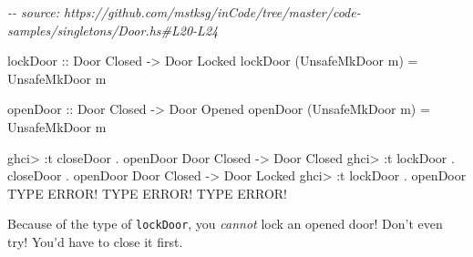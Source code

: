 \documentclass[]{article}
\newenvironment{Shaded}{}{}
\newcommand{\CommentTok}[1]{\textcolor[rgb]{0.38,0.63,0.69}{\textit{#1}}}
\newcommand{\DataTypeTok}[1]{\textcolor[rgb]{0.56,0.13,0.00}{#1}}
\newcommand{\NormalTok}[1]{#1}
\newcommand{\OperatorTok}[1]{\textcolor[rgb]{0.40,0.40,0.40}{#1}}
\newcommand{\OtherTok}[1]{\textcolor[rgb]{0.00,0.44,0.13}{#1}}
\begin{document}
\begin{Shaded}
\begin{Highlighting}[]
\CommentTok{{-}{-} source: https://github.com/mstksg/inCode/tree/master/code{-}samples/singletons/Door.hs\#L20{-}L24}

\OtherTok{lockDoor ::} \DataTypeTok{Door} \DataTypeTok{\textquotesingle{}Closed} \OtherTok{{-}>} \DataTypeTok{Door} \DataTypeTok{\textquotesingle{}Locked}
\NormalTok{lockDoor (}\DataTypeTok{UnsafeMkDoor}\NormalTok{ m) }\OtherTok{=} \DataTypeTok{UnsafeMkDoor}\NormalTok{ m}

\OtherTok{openDoor ::} \DataTypeTok{Door} \DataTypeTok{\textquotesingle{}Closed} \OtherTok{{-}>} \DataTypeTok{Door} \DataTypeTok{\textquotesingle{}Opened}
\NormalTok{openDoor (}\DataTypeTok{UnsafeMkDoor}\NormalTok{ m) }\OtherTok{=} \DataTypeTok{UnsafeMkDoor}\NormalTok{ m}
\end{Highlighting}
\end{Shaded}

\begin{Shaded}
\begin{Highlighting}[]
\NormalTok{ghci}\OperatorTok{>} \OperatorTok{:}\NormalTok{t closeDoor }\OperatorTok{.}\NormalTok{ openDoor}
\DataTypeTok{Door} \DataTypeTok{\textquotesingle{}Closed} \OtherTok{{-}>} \DataTypeTok{Door} \DataTypeTok{\textquotesingle{}Closed}
\NormalTok{ghci}\OperatorTok{>} \OperatorTok{:}\NormalTok{t lockDoor }\OperatorTok{.}\NormalTok{ closeDoor }\OperatorTok{.}\NormalTok{ openDoor}
\DataTypeTok{Door} \DataTypeTok{\textquotesingle{}Closed} \OtherTok{{-}>} \DataTypeTok{Door} \DataTypeTok{\textquotesingle{}Locked}
\NormalTok{ghci}\OperatorTok{>} \OperatorTok{:}\NormalTok{t lockDoor }\OperatorTok{.}\NormalTok{ openDoor}
\DataTypeTok{TYPE} \DataTypeTok{ERROR}\OperatorTok{!}  \DataTypeTok{TYPE} \DataTypeTok{ERROR}\OperatorTok{!}  \DataTypeTok{TYPE} \DataTypeTok{ERROR}\OperatorTok{!}
\end{Highlighting}
\end{Shaded}

Because of the type of \texttt{lockDoor}, you \emph{cannot} lock an opened door!
Don't even try! You'd have to close it first.
\end{document}

